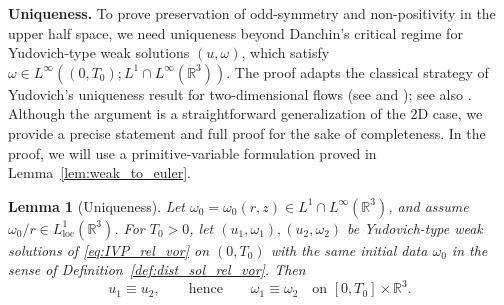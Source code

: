 \documentclass[reqno,11pt]{amsart}
\newtheorem{lemma}[theorem]{Lemma}
\begin{document}
\medskip
\noindent\textbf{Uniqueness.}
To prove preservation of odd-symmetry and non-positivity in the upper half space, we need uniqueness   beyond Danchin's critical regime for Yudovich-type weak solutions $(u,\omega)$, which satisfy $\omega \in L^\infty((0,T_0); L^1\cap L^\infty (\mathbb{R}^3)) $. The proof adapts the classical strategy of Yudovich's uniqueness result for two-dimensional flows (see \cite[Section 3]{Yudovich63} and \cite[Theorem 8.2]{MajdaBertozzi01}); see also \cite[Theorem 1.2]{Danchin07Note}. Although the argument is a straightforward generalization of the 2D case, we provide a precise statement and full proof for the sake of completeness. In the proof, we will use a primitive-variable formulation proved in Lemma~\ref{lem:weak_to_euler}.
\begin{lemma}[Uniqueness]
\label{lem:uniq_bd}
Let $\omega_0=\omega_0(r,z)\in L^1\cap L^\infty(\mathbb R^3)$, and assume $\omega_0/r\in L^{1}_{\mathrm{loc}}(\mathbb{R}^3)$.
For $T_0>0$, let
$(u_1,\omega_1),(u_2,\omega_2)$ be Yudovich-type weak solutions of \eqref{eq:IVP_rel_vor} on
$(0,T_0)$ with the same initial data $\omega_0$ in the sense of Definition~\ref{def:dist_sol_rel_vor}. 
 Then
\[
u_1\equiv u_2,
\qquad\text{hence}\qquad
\omega_1\equiv \omega_2
\quad\text{on }[0,T_0]\times\mathbb R^3.
\]
\end{lemma}
\end{document}
